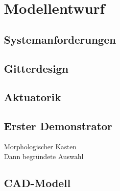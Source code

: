 \chapter{Modellentwurf}\label{sec:modellentwurf}

\section{Systemanforderungen}

\section{Gitterdesign}

\section{Aktuatorik}

\section{Erster Demonstrator}
Morphologischer Kasten\\
Dann begründete Auswahl

\section{CAD-Modell}